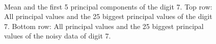 \documentclass[a4paper, 12pt, titlepage]{article}
\begin{document}
\begin{figure}[H]
	\centering
	\\
	\caption{\protect{} Mean and the first 5 principal components of the digit 7. \protect{} Top row: All principal values and the 25 biggest principal values of the digit 7. Bottom row: All principal values and the 25 biggest principal values of the noisy data of digit 7.}
\end{figure}
\end{document}
